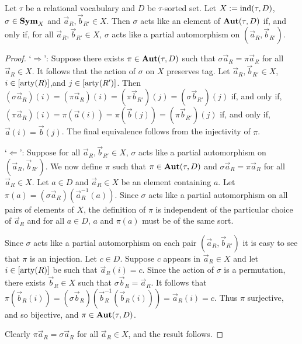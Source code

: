 \documentclass[../main/thesis.tex]{subfiles}
\begin{document}
\begin{lem}
  Let $\tau$ be a relational vocabulary and $D$ be $\tau$-sorted set. Let $X :=
  \text{\upshape ind}(\tau, D)$, $\sigma \in \text{\textbf{Sym}}_X$ and $\vec{a}_R, \vec{b}_{R'} \in X$. Then
  $\sigma$ acts like an element of $\text{\textbf{Aut}} (\tau, D)$ if, and only if, for all
  $\vec{a}_R, \vec{b}_{R'} \in X$, $\sigma$ acts like a partial automorphism on
  $(\vec{a}_R, \vec{b}_{R'})$.
  \label{lem:aut-partial}
\end{lem}
\begin{proof}
  `$\Rightarrow$': Suppose there exists $\pi \in \text{\textbf{Aut}}(\tau, D)$ such that
  $\sigma \vec{a}_R = \pi \vec{a}_R$ for all $\vec{a}_R \in X$. It follows that
  the action of $\sigma$ on $X$ preserves tag. Let $\vec{a}_R, \vec{b}_{R'} \in
  X$, $i \in [\mathrm{arty} (R)]$,and $j \in [\mathrm{arty} (R')]$. Then $(\sigma \vec{a}_R) (i)
  = (\pi \vec{a}_R)(i) = (\pi \vec{b}_{R'})(j) = (\sigma \vec{b}_{R'})(j)$ if,
  and only if, $(\pi \vec{a}_R)(i) = \pi (\vec{a}(i)) = \pi (\vec{b}(j)) =
  (\pi\vec{b}_{R'})(j)$ if, and only if, $\vec{a}(i) = \vec{b}(j)$. The final
  equivalence follows from the injectivity of $\pi$.
  
  `$\Leftarrow$': Suppose for all $\vec{a}_R, \vec{b}_{R'} \in X$, $\sigma$ acts
  like a partial automorphism on $(\vec{a}_R, \vec{b}_{R'})$. We now define
  $\pi$ such that $\pi \in \text{\textbf{Aut}}(\tau, D)$ and $\sigma \vec{a}_R = \pi \vec{a}_R$
  for all $\vec{a}_R \in X$. Let $a \in D$ and $\vec{a}_R \in X$ be an element
  containing $a$. Let $\pi (a) = (\sigma \vec{a}_R) (\vec{a}^{-1}_R(a))$. Since
  $\sigma$ acts like a partial automorphism on all pairs of elements of $X$, the
  definition of $\pi$ is independent of the particular choice of $\vec{a}_R$ and
  for all $a \in D$, $a$ and $\pi (a)$ must be of the same sort.
  
  Since $\sigma$ acts like a partial automorphism on each pair $(\vec{a}_R,
  \vec{b}_{R'})$ it is easy to see that $\pi$ is an injection. Let $c \in D$.
  Suppose $c$ appears in $\vec{a}_R \in X$ and let $i \in [\mathrm{arty}(R)]$ be such
  that $\vec{a}_R(i) = c$. Since the action of $\sigma$ is a permutation, there
  exists $\vec{b}_R \in X$ such that $\sigma \vec{b}_R = \vec{a}_R$. It follows
  that $\pi (\vec{b}_R(i)) = (\sigma \vec{b}_R) (\vec{b}^{-1}_R(\vec{b}_R(i))) =
  \vec{a}_R(i) = c$. Thus $\pi$ surjective, and so bijective, and $\pi \in
  \text{\textbf{Aut}}(\tau, D)$.

  Clearly $\pi \vec{a}_R = \sigma \vec{a}_R$ for all $\vec{a}_R \in X$, and the
  result follows.

\end{proof}
\end{document}
